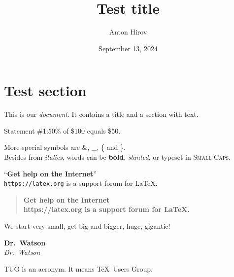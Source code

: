 \documentclass[a4paper,11pt]{article}
\title{Test title}
\author{Anton Hirov}
\date{September 13, 2024}
\newcommand{\keyword}[2][\bfseries]{{#1#2}}
\begin{document}
\maketitle
\section{Test section}
{\centering
This is our \emph{document}. It contains a title and a section with text.

}

{\raggedleft
Statement \#1:50\% of \$100 equals \$50.

}
More special symbols are \&, \_, \{ and \}.\\
Besides from \textit{italics}, words can be \textbf{bold},
\textsl{slanted}, or typeset in \textsc{Small Caps}.

``\textsf{\textbf{Get help on the Internet}}''\\
\texttt{https://latex.org} is a support forum for \LaTeX.

\begin{quote}
    \sffamily\bfseries Get help on the Internet\normalfont\\
    {\ttfamily https://latex.org} is a support forum for \LaTeX.
\end{quote}

\noindent\tiny We \scriptsize start \footnotesize very \small small,
\normalsize get \large big \Large and \LARGE bigger, \huge huge, \Huge gigantic!
\normalsize
\begin{center}
    \keyword{Dr.~Watson}\\[2mm]
    \keyword[\itshape]{Dr.~Watson}
\end{center}

\quad{}
\quad{}
\quad{}

\begin{minipage}{3cm}
\raggedright TUG is an acronym. It means \TeX\ Users Group.
\end{minipage}
\end{document}
